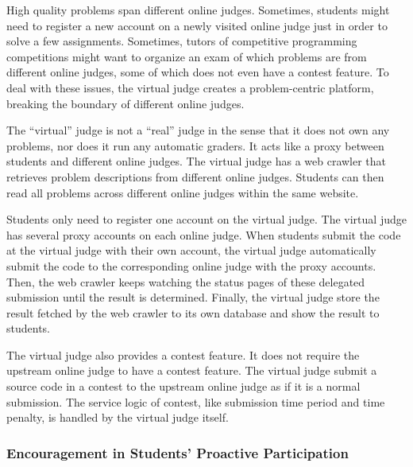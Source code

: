             High quality problems span different online judges.
            Sometimes, students might need to register a new account on a newly visited online judge
            just in order to solve a few assignments.
            Sometimes, tutors of competitive programming competitions might want to organize an exam
            of which problems are from different online judges,
            some of which does not even have a contest feature.
            To deal with these issues, the virtual judge creates a problem-centric platform,
            breaking the boundary of different online judges.

            The ``virtual'' judge is not a ``real'' judge in the sense that it does not own any problems,
            nor does it run any automatic graders.
            It acts like a proxy between students and different online judges.
            The virtual judge has a web crawler that retrieves problem descriptions from different online judges.
            Students can then read all problems across different online judges within the same website.

            Students only need to register one account on the virtual judge.
            The virtual judge has several proxy accounts on each online judge.
            When students submit the code at the virtual judge with their own account,
            the virtual judge automatically submit the code to the corresponding online judge
            with the proxy accounts.
            Then, the web crawler keeps watching the status pages of these delegated submission
            until the result is determined.
            Finally, the virtual judge store the result fetched by the web crawler to its own database
            and show the result to students.

            The virtual judge also provides a contest feature.
            It does not require the upstream online judge to have a contest feature.
            The virtual judge submit a source code in a contest to the upstream online judge
            as if it is a normal submission.
            The service logic of contest, like submission time period and time penalty, is handled
            by the virtual judge itself.

        \subsubsection{Encouragement in Students' Proactive Participation}

